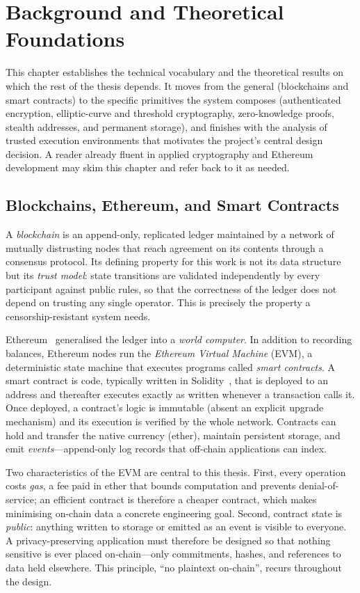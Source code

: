 \chapter{Background and Theoretical Foundations}
\label{ch:background}

This chapter establishes the technical vocabulary and the theoretical results on
which the rest of the thesis depends. It moves from the general (blockchains and
smart contracts) to the specific primitives the system composes (authenticated
encryption, elliptic-curve and threshold cryptography, zero-knowledge proofs,
stealth addresses, and permanent storage), and finishes with the analysis of
trusted execution environments that motivates the project's central design
decision. A reader already fluent in applied cryptography and Ethereum
development may skim this chapter and refer back to it as needed.

\section{Blockchains, Ethereum, and Smart Contracts}
\label{sec:bg-blockchain}

A \emph{blockchain} is an append-only, replicated ledger maintained by a network
of mutually distrusting nodes that reach agreement on its contents through a
consensus protocol. Its defining property for this work is not its data
structure but its \emph{trust model}: state transitions are validated
independently by every participant against public rules, so that the correctness
of the ledger does not depend on trusting any single operator. This is precisely
the property a censorship-resistant system needs.

Ethereum~\cite{buterin2014ethereum, wood2014ethereum} generalised the ledger
into a \emph{world computer}. In addition to recording balances, Ethereum nodes
run the \emph{Ethereum Virtual Machine} (EVM), a deterministic state machine that
executes programs called \emph{smart contracts}. A smart contract is code,
typically written in Solidity~\cite{solidity}, that is deployed to an address and
thereafter executes exactly as written whenever a transaction calls it. Once
deployed, a contract's logic is immutable (absent an explicit upgrade mechanism)
and its execution is verified by the whole network. Contracts can hold and
transfer the native currency (ether), maintain persistent storage, and emit
\emph{events}---append-only log records that off-chain applications can index.

Two characteristics of the EVM are central to this thesis. First, every
operation costs \emph{gas}, a fee paid in ether that bounds computation and
prevents denial-of-service; an efficient contract is therefore a cheaper
contract, which makes minimising on-chain data a concrete engineering goal.
Second, contract state is \emph{public}: anything written to storage or emitted
as an event is visible to everyone. A privacy-preserving application must
therefore be designed so that nothing sensitive is ever placed on-chain---only
commitments, hashes, and references to data held elsewhere. This principle,
``no plaintext on-chain'', recurs throughout the design.

